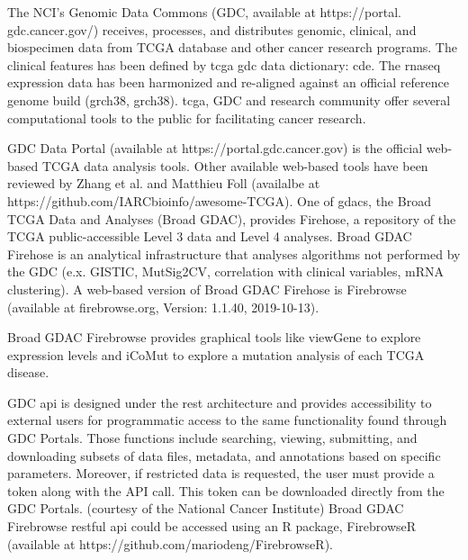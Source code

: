 \documentclass[preprint,12pt]{elsarticle}
\newenvironment{MyColorPar}[1]{%
    \leavevmode\color{#1}\ignorespaces%
}{%
}%
\begin{document}
\begin{MyColorPar}{blue}
The NCI's Genomic Data Commons (GDC, available at https://portal.\\gdc.cancer.gov/) receives, processes, and distributes genomic, clinical, and biospecimen data from TCGA database and other cancer research programs. The clinical features has been defined by \acrshort{tcga} \acrshort{gdc} data dictionary: \acrfull{cde}\cite{CDE2019}. The \acrshort{rnaseq} expression data has been harmonized and re-aligned against an official reference genome build (\acrlong{grch38}, \acrshort{grch38}).
\acrshort{tcga}, GDC and research community offer several computational tools to the public for facilitating cancer research. %

GDC Data Portal (available at https://portal.gdc.cancer.gov) is the official web-based TCGA data analysis tools. Other available web-based tools have been reviewed by Zhang et al.\cite{Zhang2019b} and 
Matthieu Foll (availalbe at https://github.com/IARCbioinfo/awesome-TCGA).
One of \acrshort{gdac}s, the Broad TCGA Data and Analyses (Broad GDAC), provides Firehose, a repository of the TCGA public-accessible Level 3 data and Level 4 analyses. Broad GDAC Firehose is an analytical infrastructure that analyses algorithms not performed by the GDC (e.x. GISTIC, MutSig2CV, correlation with clinical variables, mRNA clustering). 
A web-based version of Broad GDAC Firehose is Firebrowse (available at firebrowse.org, Version: 1.1.40, 2019-10-13).

Broad GDAC Firebrowse provides graphical tools like viewGene to explore expression levels and iCoMut to explore a mutation analysis of each TCGA disease. 


GDC \acrfull{api} is designed under the \acrfull{rest} architecture and provides accessibility to external users for programmatic access to the same functionality found through GDC Portals. Those functions include searching, viewing, submitting, and downloading subsets of data files, metadata, and annotations based on specific parameters. Moreover, if restricted data is requested, the user must provide a token along with the API call. This token can be downloaded directly from the GDC Portals. (courtesy of the National Cancer Institute)
Broad GDAC Firebrowse \acrshort{rest}ful \acrshort{api} could be accessed using an R package, FirebrowseR (available at https://github.com/mariodeng/FirebrowseR)\cite{Deng2017}.


\end{MyColorPar}
\end{document}
